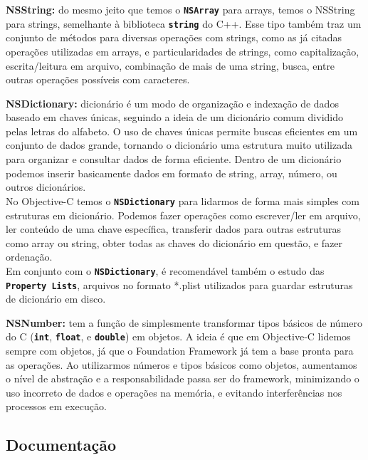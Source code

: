\documentclass[a4paper,12pt,brazil,doubleside]{book}
\begin{document}
\begin{singlespace}
\begin{description}
\item{\textbf{NSString:} do mesmo jeito que temos o \texttt{\textbf{NSArray}} para arrays, temos o NSString para strings, semelhante à biblioteca \texttt{\textbf{string}} do C++. Esse tipo também traz um conjunto de métodos para diversas operações com strings, como as já citadas operações utilizadas em arrays, e particularidades de strings, como capitalização, escrita/leitura em arquivo, combinação de mais de uma string, busca, entre outras operações possíveis com caracteres.}

\item{\textbf{NSDictionary:} dicionário é um modo de organização e indexação de dados baseado em chaves únicas, seguindo a ideia de um dicionário comum dividido pelas letras do alfabeto. O uso de chaves únicas permite buscas eficientes em um conjunto de dados grande, tornando o dicionário uma estrutura muito utilizada para organizar e consultar dados de forma eficiente. Dentro de um dicionário podemos inserir basicamente dados em formato de string, array, número, ou outros dicionários.\\
No Objective-C temos o \texttt{\textbf{NSDictionary}} para lidarmos de forma mais simples com estruturas em dicionário. Podemos fazer operações como escrever/ler em arquivo, ler conteúdo de uma chave específica, transferir dados para outras estruturas como array ou string, obter todas as chaves do dicionário em questão, e fazer ordenação.\\
Em conjunto com o \texttt{\textbf{NSDictionary}}, é recomendável também o estudo das \texttt{\textbf{Property Lists}}, arquivos no formato *.plist utilizados para guardar estruturas de dicionário em disco.}

\item{\textbf{NSNumber:} tem a função de simplesmente transformar tipos básicos de número do C (\texttt{\textbf{int}}, \texttt{\textbf{float}}, e \texttt{\textbf{double}}) em objetos. A ideia é que em Objective-C lidemos sempre com objetos, já que o Foundation Framework já tem a base pronta para as operações. Ao utilizarmos números e tipos básicos como objetos, aumentamos o nível de abstração e a responsabilidade passa ser do framework, minimizando o uso incorreto de dados e operações na memória, e evitando interferências nos processos em execução.}
\end{description}

\bigskip

\subsection{Documentação}



\end{singlespace}
\end{document}

